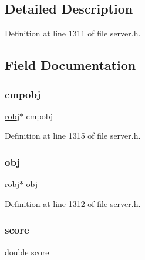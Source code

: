 \subsection{Detailed Description}


Definition at line 1311 of file server.\+h.



\subsection{Field Documentation}
\mbox{\label{struct__redis_sort_object_a5a84c8f22865dd4299870240e1db9f58}} 
\subsubsection{\texorpdfstring{cmpobj}{cmpobj}}
{\footnotesize\ttfamily \hyperlink{server_8h_a540f174d2685422fbd7d12e3cd44c8e2}{robj}$\ast$ cmpobj}



Definition at line 1315 of file server.\+h.

\mbox{\label{struct__redis_sort_object_ab823bb3761b604174d6c31727a47bebc}} 
\subsubsection{\texorpdfstring{obj}{obj}}
{\footnotesize\ttfamily \hyperlink{server_8h_a540f174d2685422fbd7d12e3cd44c8e2}{robj}$\ast$ obj}



Definition at line 1312 of file server.\+h.

\mbox{\label{struct__redis_sort_object_a40a24ec85daa9ac70aa74e4ca744f838}} 
\subsubsection{\texorpdfstring{score}{score}}
{\footnotesize\ttfamily double score}



